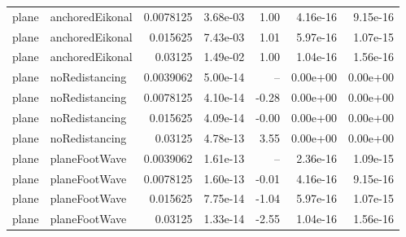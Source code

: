 \begin{tabular}{l l r r r r r}
plane & anchoredEikonal & 0.0078125 & 3.68e-03 & 1.00 & 4.16e-16 & 9.15e-16 \\
plane & anchoredEikonal & 0.015625 & 7.43e-03 & 1.01 & 5.97e-16 & 1.07e-15 \\
plane & anchoredEikonal & 0.03125 & 1.49e-02 & 1.00 & 1.04e-16 & 1.56e-16 \\
\hline
plane & noRedistancing & 0.0039062 & 5.00e-14 & -- & 0.00e+00 & 0.00e+00 \\
plane & noRedistancing & 0.0078125 & 4.10e-14 & -0.28 & 0.00e+00 & 0.00e+00 \\
plane & noRedistancing & 0.015625 & 4.09e-14 & -0.00 & 0.00e+00 & 0.00e+00 \\
plane & noRedistancing & 0.03125 & 4.78e-13 & 3.55 & 0.00e+00 & 0.00e+00 \\
\hline
plane & planeFootWave & 0.0039062 & 1.61e-13 & -- & 2.36e-16 & 1.09e-15 \\
plane & planeFootWave & 0.0078125 & 1.60e-13 & -0.01 & 4.16e-16 & 9.15e-16 \\
plane & planeFootWave & 0.015625 & 7.75e-14 & -1.04 & 5.97e-16 & 1.07e-15 \\
plane & planeFootWave & 0.03125 & 1.33e-14 & -2.55 & 1.04e-16 & 1.56e-16 \\
\hline
\end{tabular}
